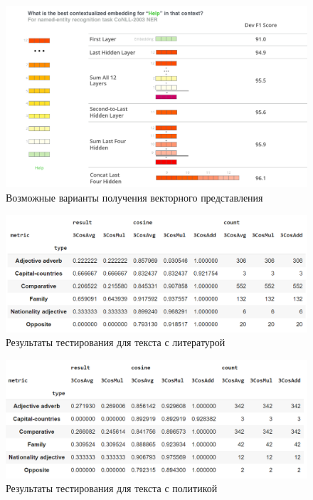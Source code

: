 \documentclass[a4paper,14pt]{article}
\begin{document}
	
\begin{figure}[H]
	\centering
	\includegraphics[width=0.7\linewidth]{image/irvrsv9mefroz7io6ilnjng3fo4}
	\caption{Возможные варианты получения векторного представления}
	\label{fig:dif_vars_get_v}
\end{figure}

\begin{figure}[H]
	\centering
	\includegraphics[width=0.7\linewidth]{image/liter}
	\caption{Результаты тестирования для текста с литературой}
	\label{fig:liter}
\end{figure}

\begin{figure}[H]
	\centering
	\includegraphics[width=0.7\linewidth]{image/politics}
	\caption{Результаты тестирования для текста с политикой}
	\label{fig:politics}
\end{figure}


	
\end{document}
